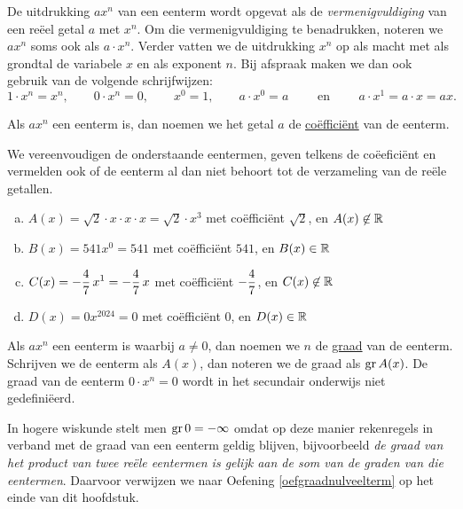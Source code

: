\documentclass{ximera}
\begin{document}
De uitdrukking $ax^n$ van een eenterm wordt opgevat als de {\em vermenigvuldiging} van een re\"eel getal $a$ met $x^n$. Om die vermenigvuldiging te benadrukken, noteren we $ax^n$ soms ook als $a \cdot x^n$. Verder vatten we de uitdrukking $x^n$ op als macht met als grondtal de variabele $x$ en als exponent $n$. Bij afspraak maken we dan ook gebruik van de volgende schrijfwijzen:
\[
1\cdot x^n = x^n, \qquad
0\cdot x^n = 0, \qquad  
x^0 = 1, \qquad 
a\cdot x^0 = a \qquad \text{ en } \qquad 
a\cdot x^1 = a \cdot x = ax.
\]

Als $ax^n$ een eenterm is, dan noemen we het getal $a$ de \underline{co\"effici\"ent} van de eenterm.

\begin{example} 
We vereenvoudigen de onderstaande eentermen, geven telkens de co\"eefici\"ent en vermelden ook of de eenterm al dan niet behoort tot de verzameling van de re\"ele getallen.
\begin{enumerate}[(a)]
\item
$A(x) = \sqrt{2}\cdot x \cdot x \cdot x = \sqrt{2}\cdot x^3$ met co\"effici\"ent $\sqrt{2}$, en $A(x) \not\in \mathbb{R}$
\item
$B(x) = 541x^0 = 541$ met co\"effici\"ent $541$, en $B(x) \in \mathbb{R}$ 
\item
$\displaystyle C(x) = -\frac{4}{7}\,x^1 = -\frac{4}{7}\,x$ met co\"effici\"ent $\displaystyle -\frac{4}{7}$, en $C(x) \not\in \mathbb{R}$
\item
$D(x) = 0 x^{2024} = 0$ met co\"effici\"ent $0$, en $D(x) \in \mathbb{R}$ 
\end{enumerate}
\end{example} 

Als $ax^n$ een eenterm is waarbij $a \neq 0$, dan noemen we $n$ de \underline{graad} van de eenterm. Schrijven we de eenterm als $A(x)$, dan noteren we de graad als $\operatorname{gr} A(x)$. De graad van de eenterm $0\cdot x^n = 0$ wordt in het secundair onderwijs niet gedefini\"eerd.

\medskip

\begin{Uitbreiding}
In hogere wiskunde stelt men $\operatorname{gr} 0 = - \infty$ omdat op deze manier rekenregels in verband met de graad van een eenterm geldig blijven, bijvoorbeeld 
{\em de graad van het product van twee re\"ele eentermen is gelijk aan de som van de graden van die eentermen}. Daarvoor verwijzen we naar Oefening \ref{oefgraadnulveelterm} op het einde van dit hoofdstuk.
\end{Uitbreiding}
\end{document}
